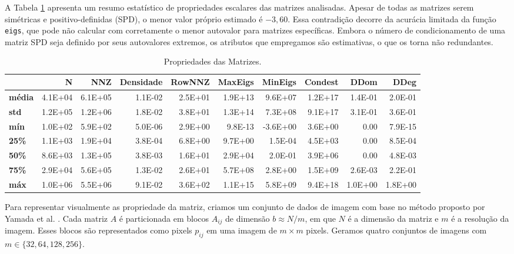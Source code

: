 \documentclass{pssbmac}
\begin{document}
A Tabela \ref{tab:scalar_features_summary} apresenta um resumo estatístico de propriedades escalares das matrizes analisadas. 
Apesar de todas as matrizes serem simétricas e  positivo-definidas (SPD), o menor valor próprio estimado é 
$-3,60$. Essa contradição decorre da acurácia limitada da função \texttt{eigs}, que pode não calcular com 
corretamente o menor autovalor para matrizes específicas. 
Embora o número de condicionamento de uma matriz SPD seja definido por seus autovalores extremos, os atributos que 
empregamos são estimativas, o que os torna não redundantes.
\begin{table}
    \caption{Propriedades das Matrizes.}
    \label{tab:scalar_features_summary}
    \begin{adjustbox}{width=\textwidth}
    \begin{tabular}{lrrrrrrrrr}
    \toprule
    & N & NNZ & Densidade & RowNNZ& MaxEigs & MinEigs & Condest & DDom & DDeg \\
    \midrule
    \textbf{média} & 4.1E+04& 6.1E+05& 1.1E-02& 2.5E+01& 1.9E+13& 9.6E+07& 1.2E+17& 1.4E-01& 2.0E-01\\
    \textbf{std} & 1.2E+05& 1.2E+06& 1.8E-02& 3.8E+01& 1.3E+14& 7.3E+08& 9.1E+17& 3.1E-01& 3.6E-01\\
    \textbf{mín} & 1.0E+02& 5.9E+02& 5.0E-06& 2.9E+00& 9.8E-13& -3.6E+00& 3.6E+00& 0.00& 7.9E-15\\
    \textbf{25\%} & 1.1E+03& 1.9E+04& 3.8E-04& 6.8E+00& 9.7E+00& 1.5E-04& 4.5E+03& 0.00& 8.5E-04\\
    \textbf{50\%} & 8.6E+03& 1.3E+05& 3.8E-03& 1.6E+01& 2.9E+04& 2.0E-01& 3.9E+06& 0.00& 4.8E-03\\
    \textbf{75\%} & 2.9E+04& 5.6E+05& 1.3E-02& 2.6E+01& 5.7E+08& 2.8E+00& 1.5E+09& 2.6E-03& 2.2E-01\\
    \textbf{máx} & 1.0E+06& 5.5E+06& 9.1E-02& 3.6E+02& 1.1E+15& 5.8E+09& 9.4E+18& 1.0E+00& 1.8E+00\\
    \bottomrule
    \end{tabular}
    \end{adjustbox}
\end{table}

Para representar visualmente as propriedade da matriz, criamos um conjunto de dados de imagem com base 
no método proposto por Yamada et al. \cite{yamada2018preconditioner}. Cada matriz \( A \) é particionada 
em blocos \( A_{ij} \) de dimensão \( b \approx N / m \), em que \( N \) é a dimensão da matriz e $m$ é a 
resolução da imagem. Esses blocos são representados como pixels \( p_{ij} \) em uma imagem de \( m \times m \) pixels.
Geramos quatro conjuntos de imagens com \( m \in \{32, 64, 128, 256\}\).
\end{document}
